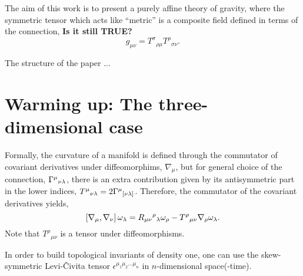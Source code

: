 \documentclass[twocolumn,
  showpacs,showkeys,prd,superscriptaddress]{revtex4-1}
\newcommand{\hl}[1]{{\color{red} \textbf{#1}}}
\begin{document}


The aim of this work is to present a purely affine theory of gravity, where the symmetric tensor which acts like ``metric'' is a composite field defined in terms of the connection, \hl{Is it still TRUE?}
\begin{equation}
  g_{\mu\nu} = T^\sigma{}_{\rho\mu} T^\rho{}_{\sigma\nu}.
\end{equation}

The structure of the paper ...




\section{Warming up: The three-dimensional case}

Formally, the curvature of a manifold is defined through the commutator of covariant derivatives under diffeomorphims, $\nabla_\mu$, but for general choice of the connection, $\Gamma^\mu{}_{\nu\lambda}$, there is an extra contribution given by its antisymmetric part in the lower indices, $T^\mu{}_{\nu\lambda}=2\Gamma^\mu{}_{[\nu\lambda]}$. Therefore, the commutator of the covariant derivatives yields,
\begin{equation}
  \left[\nabla_{{\mu}},\nabla_{{\nu}}\right]\omega_\lambda = R_{\mu\nu}{}^\rho{}_\lambda \omega _\rho - T^\rho{}_{\mu\nu}\nabla_{{\rho}}\omega_\lambda.\label{curvdef}
\end{equation}
Note that $T^\rho{}_{\mu\nu}$ is a  tensor under diffeomorphisms.

In order to build topological invariants of density one, one can use the skew-symmetric Levi-\v{C}ivita tensor $\epsilon^{\mu_1\mu_2\dots\mu_n}$ in $n$-dimensional space(-time).
\end{document}
